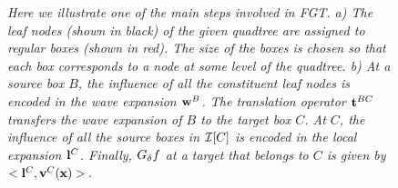 \documentclass[conference]{IEEEtran}
\begin{document}
\begin{figure}[htp]
\begin{center}
 \end{center}
\caption{\em Here we illustrate one of the main steps involved in
  FGT. a) The leaf nodes (shown in black) of the given quadtree
  are assigned to regular boxes (shown in red). The size of the boxes
  is chosen so that each box corresponds to a node at some level of
  the quadtree. b) At a source box $B$, the influence of all  
  the constituent leaf nodes is encoded in the wave expansion
  $\mathbf{w}^B$. The translation operator  
  $\mathbf{t}^{BC}$ transfers the wave expansion of $B$ to the target box
  $C$. At $C$, the influence of all the source
  boxes in $\mathcal{I}[C]$ is encoded in the local expansion $\mathbf{l}^C$.
  Finally, $G_{\delta} f$ at a target that belongs to $C$ is given by
  $<\mathbf{l}^C, \mathbf{v}^C(\mathbf{x})>$.}\label{fig:Grid}
\end{figure}
\end{document}
